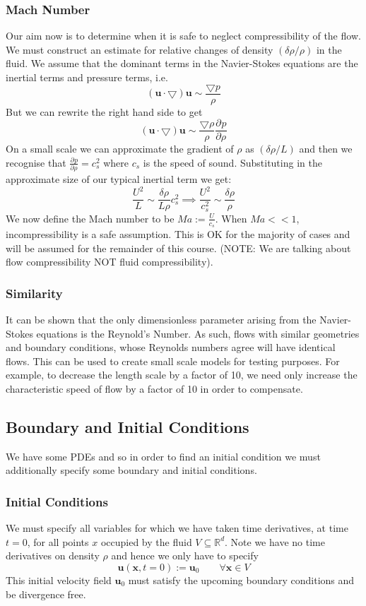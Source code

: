 \documentclass[11pt]{article}
\newcommand*{\pd}[3][]{\ensuremath{\frac{\partial^{#1} {#2}}{\partial {#3}^{#1}}}}
\newcommand{\grad}{\bigtriangledown}
\newcommand{\defeq}{:=}
\newcommand{\mv}[1]{\textbf{#1}}
\newcommand{\mdf}[1]{{\color{red}#1}}
\begin{document}
\subsubsection{Mach Number}
Our aim now is to determine when it is safe to neglect compressibility of the flow. We must construct an estimate for relative changes of density $(\delta\rho / \rho)$ in the fluid.
We assume that the dominant terms in the Navier-Stokes equations are the inertial terms and pressure terms, i.e.
$$(\mv{u}\cdot\grad)\mv{u}\sim \frac{\grad p}{\rho}$$
But we can rewrite the right hand side to get
$$(\mv{u}\cdot\grad)\mv{u}\sim \frac{\grad \rho}{\rho}\pd{p}{\rho}$$
On a small scale we can approximate the gradient of $\rho$ as $(\delta\rho/L)$ and then we recognise that $\pd{p}{\rho}=c_s^2$ where $c_s$ is the speed of sound. Substituting in the approximate size of our typical inertial term we get:
$$\frac{U^2}{L}\sim \frac{\delta\rho}{L\rho}c_s^2\implies \frac{U^2}{c_s^2}\sim\frac{\delta\rho}{\rho}$$
We now define the \mdf{Mach number} to be $Ma\defeq\frac{U}{c_s}$.
When $Ma << 1 $, incompressibility is a safe assumption.
This is OK for the majority of cases and will be assumed for the remainder of this course.
(NOTE: We are talking about flow compressibility NOT fluid compressibility).
\subsubsection{Similarity}
It can be shown that the only dimensionless parameter arising from the Navier-Stokes equations is the Reynold's Number.
As such, flows with similar geometries and boundary conditions, whose Reynolds numbers agree will have identical flows.
This can be used to create small scale models for testing purposes.
For example, to decrease the length scale by a factor of 10, we need only increase the characteristic speed of flow by a factor of 10 in order to compensate.

\subsection{Boundary and Initial Conditions}
We have some PDEs and so in order to find an initial condition we must additionally specify some boundary and initial conditions.

\subsubsection{Initial Conditions}
We must specify all variables for which we have taken time derivatives, at time $t=0$, for all points $x$ occupied by the fluid $V\subseteq\mathbb{R}^d$. Note we have no time derivatives on density $\rho$ and hence we only have to specify
$$\mv{u}(\mv{x},t=0)\defeq\mv{u}_0\quad\quad\forall\mv{x}\in V$$
This \mdf{initial velocity field} $\mv{u}_0$ must satisfy the upcoming boundary conditions and be divergence free.
\end{document}
